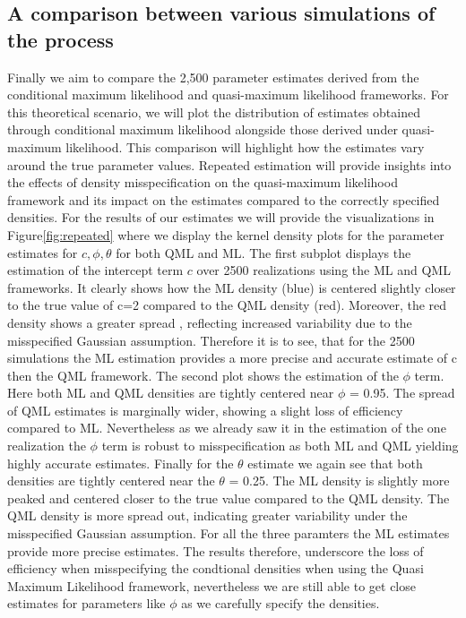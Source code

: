 \documentclass[12pt]{article}
\begin{document}
\subsection{A comparison between various simulations of the process}
Finally we aim to compare the 2,500 parameter estimates derived from the conditional maximum likelihood and quasi-maximum likelihood frameworks.
For this theoretical scenario, we will plot the distribution of estimates obtained through conditional maximum likelihood alongside those derived under quasi-maximum likelihood. This comparison will highlight how the estimates vary around the true parameter values. Repeated estimation will provide insights into the effects of density misspecification on the quasi-maximum likelihood framework and its impact on the estimates compared to the correctly specified densities.
For the results of our estimates we will provide the visualizations in Figure\ref{fig:repeated} where we display the kernel density plots for the parameter estimates for $c, \phi,\theta$ for both QML and ML.
The first subplot displays the estimation of the intercept term $c$ over 2500 realizations using the ML and QML frameworks. 
It clearly shows how the ML density (blue) is centered slightly closer to the true value of c=2 compared to the QML density (red). 
Moreover, the red density shows a greater spread , reflecting increased variability due to the misspecified Gaussian assumption.
Therefore it is to see, that for the 2500 simulations the ML estimation provides a more precise and accurate estimate of c then the QML framework.
The second plot shows the estimation of the $\phi$ term. 
Here both ML and QML densities are tightly centered near $\phi$ = 0.95. The spread of QML estimates is marginally wider, showing a slight loss of efficiency compared to ML. Nevertheless as we already saw it in the estimation of the one realization the $\phi$ term is robust to misspecification as both ML and QML yielding highly accurate estimates.
Finally for the $\theta$ estimate we again see that both densities are tightly centered near the $\theta$ = 0.25. The ML density is slightly more peaked and centered closer to the true value compared to the QML density. The QML density is more spread out, indicating greater variability under the misspecified Gaussian assumption.
For all the three paramters the ML estimates provide more precise estimates.
The results therefore, underscore the loss of efficiency when misspecifying the condtional densities when using the Quasi Maximum Likelihood framework, nevertheless we are still able to get close estimates for parameters like $\phi$ as we carefully specify the densities.
\end{document}
